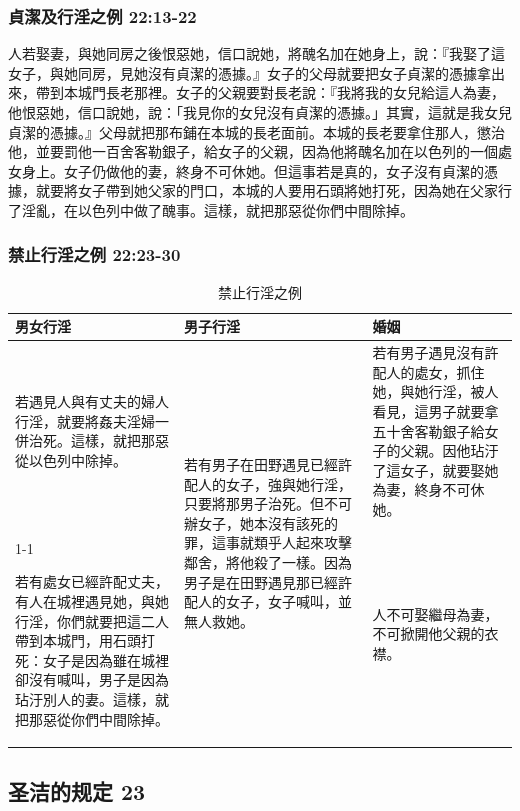 \subsubsection{貞潔及行淫之例 22:13-22}
人若娶妻，與她同房之後恨惡她，信口說她，將醜名加在她身上，說：『我娶了這女子，與她同房，見她沒有貞潔的憑據。』女子的父母就要把女子貞潔的憑據拿出來，帶到本城門長老那裡。女子的父親要對長老說：『我將我的女兒給這人為妻，他恨惡她，信口說她，說：「我見你的女兒沒有貞潔的憑據。」其實，這就是我女兒貞潔的憑據。』父母就把那布鋪在本城的長老面前。本城的長老要拿住那人，懲治他，並要罰他一百舍客勒銀子，給女子的父親，因為他將醜名加在以色列的一個處女身上。女子仍做他的妻，終身不可休她。但這事若是真的，女子沒有貞潔的憑據，就要將女子帶到她父家的門口，本城的人要用石頭將她打死，因為她在父家行了淫亂，在以色列中做了醜事。這樣，就把那惡從你們中間除掉。

\subsubsection{禁止行淫之例 22:23-30}
\begin{table}[H]
\begin{center}
\begin{tabular}{ p{6.3cm}|p{}|p{6.40cm}} \toprule
男女行淫&男子行淫&婚姻\\\hline
若遇見人與有丈夫的婦人行淫，就要將姦夫淫婦一併治死。這樣，就把那惡從以色列中除掉。
&\multirow{5}{*}{\parbox{4cm}{若有男子在田野遇見已經許配人的女子，強與她行淫，只要將那男子治死。但不可辦女子，她本沒有該死的罪，這事就類乎人起來攻擊鄰舍，將他殺了一樣。因為男子是在田野遇見那已經許配人的女子，女子喊叫，並無人救她。}} 
&若有男子遇見沒有許配人的處女，抓住她，與她行淫，被人看見，這男子就要拿五十舍客勒銀子給女子的父親。因他玷汙了這女子，就要娶她為妻，終身不可休她。\\\cline{1-1}\cline{3-3}

若有處女已經許配丈夫，有人在城裡遇見她，與她行淫，你們就要把這二人帶到本城門，用石頭打死：女子是因為雖在城裡卻沒有喊叫，男子是因為玷汙別人的妻。這樣，就把那惡從你們中間除掉。& &人不可娶繼母為妻，不可掀開他父親的衣襟。\\\hline
\end{tabular}
\end{center}
\caption{禁止行淫之例}
\end{table}

\subsection{圣洁的规定 23}
